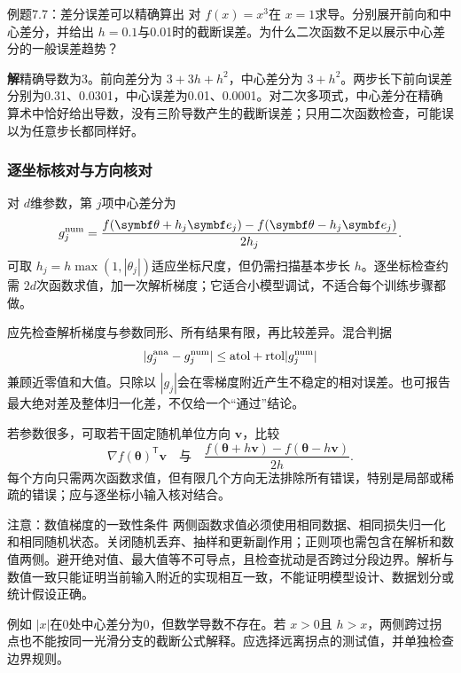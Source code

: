 \documentclass[UTF8,fontset=none,zihao=-4,a4paper]{ctexart}
\newcommand{\sol}{\par\noindent\textbf{解}\quad}
\numberwithin{equation}{section}
\numberwithin{figure}{section}
\begin{document}
\begin{infobox}{例题7.7：差分误差可以精确算出}
对 $f(x)=x^3$在 $x=1$求导。分别展开前向和中心差分，并给出 $h=0.1$与0.01时的截断误差。为什么二次函数不足以展示中心差分的一般误差趋势？
\end{infobox}
\sol 精确导数为3。前向差分为 $3+3h+h^2$，中心差分为 $3+h^2$。两步长下前向误差分别为0.31、0.0301，中心误差为0.01、0.0001。对二次多项式，中心差分在精确算术中恰好给出导数，没有三阶导数产生的截断误差；只用二次函数检查，可能误以为任意步长都同样好。

\subsubsection{逐坐标核对与方向核对}
对 $d$维参数，第 $j$项中心差分为
\[
 g_j^{\rm num}=\frac{f(\symbf\theta+h_j\symbf e_j)-f(\symbf\theta-h_j\symbf e_j)}{2h_j}.
\]
可取 $h_j=h\max(1,|\theta_j|)$适应坐标尺度，但仍需扫描基本步长 $h$。逐坐标检查约需 $2d$次函数求值，加一次解析梯度；它适合小模型调试，不适合每个训练步骤都做。

应先检查解析梯度与参数同形、所有结果有限，再比较差异。混合判据
\[
 |g_j^{\rm ana}-g_j^{\rm num}|\le\text{atol}+\text{rtol}|g_j^{\rm num}|
\]
兼顾近零值和大值。只除以 $|g_j|$会在零梯度附近产生不稳定的相对误差。也可报告最大绝对差及整体归一化差，不仅给一个“通过”结论。

若参数很多，可取若干固定随机单位方向 $\symbf v$，比较
\[
 \nabla f(\symbf\theta)^{\mathsf T}\symbf v
 \quad\text{与}\quad
 \frac{f(\symbf\theta+h\symbf v)-f(\symbf\theta-h\symbf v)}{2h}.
\]
每个方向只需两次函数求值，但有限几个方向无法排除所有错误，特别是局部或稀疏的错误；应与逐坐标小输入核对结合。

\begin{infobox}{注意：数值梯度的一致性条件}
两侧函数求值必须使用相同数据、相同损失归一化和相同随机状态。关闭随机丢弃、抽样和更新副作用；正则项也需包含在解析和数值两侧。避开绝对值、最大值等不可导点，且检查扰动是否跨过分段边界。解析与数值一致只能证明当前输入附近的实现相互一致，不能证明模型设计、数据划分或统计假设正确。
\end{infobox}
例如 $|x|$在0处中心差分为0，但数学导数不存在。若 $x>0$且 $h>x$，两侧跨过拐点也不能按同一光滑分支的截断公式解释。应选择远离拐点的测试值，并单独检查边界规则。
\end{document}
